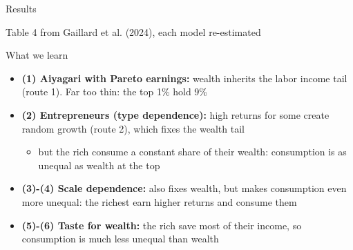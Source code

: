 \documentclass[10pt,english,10pt,handout]{beamer}
\begin{document}
\begin{frame}{Results}
\begin{center}
\end{center}
{\footnotesize Table 4 from Gaillard et al. (2024), each model re-estimated}
\end{frame}

\begin{frame}{What we learn}
\begin{itemize}
\item \textbf{(1) Aiyagari with Pareto earnings:} wealth inherits the labor income tail (route 1). Far too thin: the top 1\% hold 9\%
\item \textbf{(2) Entrepreneurs (type dependence):} high returns for some create random growth (route 2), which fixes the wealth tail
\begin{itemize}
\item but the rich consume a constant share of their wealth: consumption is as unequal as wealth at the top
\end{itemize}
\item \textbf{(3)-(4) Scale dependence:} also fixes wealth, but makes consumption even more unequal: the richest earn higher returns and consume them
\item \textbf{(5)-(6) Taste for wealth:} the rich save most of their income, so consumption is much less unequal than wealth
\end{itemize}
\end{frame}
\end{document}
